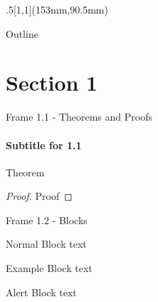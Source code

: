 \documentclass[xcolor=svgnames]{beamer}
\title[\shorttitle]{\maintitle}
\subtitle{\sbtitle}
\author[\sauthors]{\lauthors\\ \scriptsize{\em \home}}
\institute{\venue\\ \tiny{\location}}
\date[\sdate]{\scriptsize{\ldate}}
\numberwithin{equation}{section}
\numberwithin{figure}{section}
\begin{document}
\usebackgroundtemplate{}
\begin{frame}[plain]
	\titlepage
	
	\begin{textblock*}{.5\linewidth}[1,1](153mm,90.5mm)
		{\tiny
			\vskip5pt
			\vskip5pt
			
		}
	\end{textblock*}
	
	
	\addbuild
	
	\addtocounter{framenumber}{-1}
\end{frame}

\begin{frame}[plain]{Outline}
	\tableofcontents
\end{frame}
\usebackgroundtemplate{}

\section{Section 1}
\begin{frame}{Frame 1.1 - Theorems and Proofs}
	\framesubtitle{Subtitle for 1.1}
	\begin{theorem}
		Theorem
	\end{theorem}
	\begin{proof}
		Proof
	\end{proof}
\end{frame}

\begin{frame}{Frame 1.2 - Blocks}
	\begin{block}{Normal Block}
		text
	\end{block}
	
	\begin{exampleblock}{Example Block}
		text
	\end{exampleblock}
	
	\begin{alertblock}{Alert Block}
		text
	\end{alertblock}
\end{frame}
\end{document}
